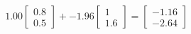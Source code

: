 \documentclass[preview]{standalone}
\begin{document}
\begin{align*}
1.00 \begin{bmatrix} 0.8 \\ 0.5 \end{bmatrix} + -1.96 \begin{bmatrix} 1 \\ 1.6 \end{bmatrix} = \begin{bmatrix} -1.16 \\ -2.64 \end{bmatrix}
\end{align*}
\end{document}
